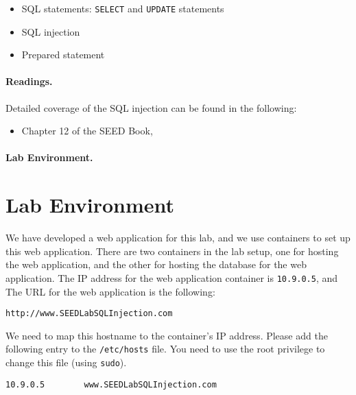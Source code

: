 \begin{itemize}[noitemsep]
\item SQL statements: \texttt{SELECT} and \texttt{UPDATE} statements
\item SQL injection
\item Prepared statement
\end{itemize}



\paragraph{Readings.}
Detailed coverage of the SQL injection can be found in the following:

\begin{itemize}
\item Chapter 12 of the SEED Book, \seedbook
\end{itemize}

\paragraph{Lab Environment.} 
\seedenvironmentB 
\nodependency


\section{Lab Environment}


We have developed a web application for this lab, and 
we use containers to set up this web application. There 
are two containers in the lab setup, one for hosting 
the web application, and the other for hosting the database 
for the web application. 
The IP address for the web application container is \texttt{10.9.0.5}, and 
The URL for the web application is the following:

\begin{lstlisting}
http://www.SEEDLabSQLInjection.com
\end{lstlisting}
 
We need to map this hostname to the container's IP address. Please 
add the following entry to the \texttt{/etc/hosts} file. 
You need to use the root privilege to
change this file (using \texttt{sudo}).

\begin{lstlisting}
10.9.0.5        www.SEEDLabSQLInjection.com
\end{lstlisting}
 

